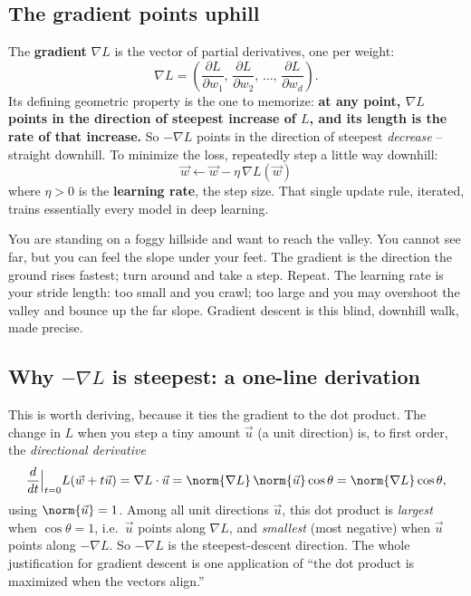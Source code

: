 \subsection{The gradient points uphill}

The \textbf{gradient} $\nabla L$ is the vector of partial derivatives, one per weight:
\[
\nabla L = \left(\frac{\partial L}{\partial w_1},\,\frac{\partial L}{\partial w_2},\,
\ldots,\,\frac{\partial L}{\partial w_d}\right).
\]
Its defining geometric property is the one to memorize: \textbf{at any point, $\nabla L$
points in the direction of steepest increase of $L$, and its length is the rate of that
increase.} So $-\nabla L$ points in the direction of steepest \emph{decrease} -- straight
downhill. To minimize the loss, repeatedly step a little way downhill:
\[
\boxed{\;\vec{w} \leftarrow \vec{w} - \eta\,\nabla L(\vec{w})\;}
\]
where $\eta>0$ is the \textbf{learning rate}, the step size. That single update rule,
iterated, trains essentially every model in deep learning.

\begin{intuitionbox}
You are standing on a foggy hillside and want to reach the valley. You cannot see far,
but you can feel the slope under your feet. The gradient is the direction the ground rises
fastest; turn around and take a step. Repeat. The learning rate is your stride length:
too small and you crawl; too large and you may overshoot the valley and bounce up the far
slope. Gradient descent is this blind, downhill walk, made precise.
\end{intuitionbox}

\subsection{Why $-\nabla L$ is steepest: a one-line derivation}

This is worth deriving, because it ties the gradient to the dot product. The change in
$L$ when you step a tiny amount $\vec{u}$ (a unit direction) is, to first order, the
\emph{directional derivative}
\[
\frac{d}{dt}\Big|_{t=0} L(\vec{w}+t\vec{u}) = \nabla L \cdot \vec{u}
= \norm{\nabla L}\,\norm{\vec{u}}\cos\theta = \norm{\nabla L}\cos\theta,
\]
using $\norm{\vec{u}}=1$. Among all unit directions $\vec{u}$, this dot product is
\emph{largest} when $\cos\theta=1$, i.e.\ $\vec{u}$ points along $\nabla L$, and
\emph{smallest} (most negative) when $\vec{u}$ points along $-\nabla L$. So $-\nabla L$ is
the steepest-descent direction. The whole justification for gradient descent is one
application of ``the dot product is maximized when the vectors align.''


